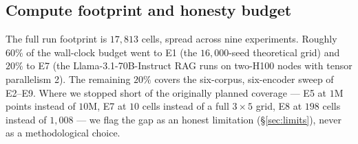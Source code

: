 \subsection{Compute footprint and honesty budget}
\label{sec:experiments:compute}

The full run footprint is $17{,}813$ cells, spread across nine
experiments. Roughly $60\%$ of the wall-clock budget went to E1 (the
$16{,}000$-seed theoretical grid) and $20\%$ to E7 (the
Llama-3.1-70B-Instruct RAG runs on two-H100 nodes with tensor parallelism
2). The remaining $20\%$ covers the six-corpus, six-encoder sweep of
E2--E9. Where we stopped short of the originally planned coverage --- E5
at $1$M points instead of $10$M, E7 at $10$ cells instead of a full
$3 \times 5$ grid, E8 at $198$ cells instead of $1{,}008$ --- we flag the
gap as an honest limitation (\S\ref{sec:limits}), never
as a methodological choice.
